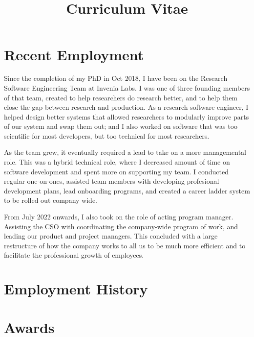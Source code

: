 \documentclass[11pt,a4paper,sans]{moderncv}
\title{Curriculum Vitae}
\begin{document}
\makecvtitle

\section{Recent Employment}
Since the completion of my PhD in Oct 2018, I have been on the Research Software Engineering Team at Invenia Labs.
I was one of three founding members of that team, created to help researchers do research better, and to help them close the gap between research and production.
As a research software engineer, I helped design better systems that allowed researchers to modularly improve parts of our system and swap them out;
and I also worked on software that was too scientific for most developers, but too technical for most researchers.

As the team grew, it eventually required a lead to take on a more managemental role.
This was a hybrid technical role, where I decreased amount of time on software development and spent more on supporting my team.
I conducted regular one-on-ones, assisted team members with developing profesional development plans, lead onboarding programs, and created a career ladder system to be rolled out company wide.

From July 2022 onwards, I also took on the role of acting program manager.
Assisting the CSO with coordinating the company-wide program of work, and leading our product and project managers.
This concluded with a large restructure of how the company works to all us to be much more efficient and to facilitate the professional growth of employees.

\section{Employment History}

\section{Awards}
\end{document}
